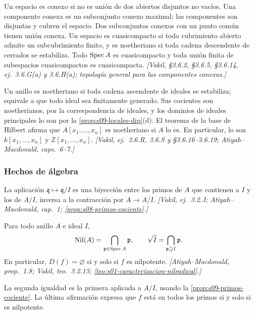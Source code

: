 \begin{defi}
\label{defi:s09-topologia-finita}
Un espacio es conexo si no es unión de dos abiertos disjuntos no vacíos. Una componente conexa es un subconjunto conexo maximal; las componentes son disjuntas y cubren el espacio. Dos subconjuntos conexos con un punto común tienen unión conexa. Un espacio es cuasicompacto si todo cubrimiento abierto admite un subcubrimiento finito, y es noetheriano si toda cadena descendente de cerrados se estabiliza. Todo $\operatorname{Spec} A$ es cuasicompacto y toda unión finita de subespacios cuasicompactos es cuasicompacta. \emph{[Vakil, \S3.6.2, \S3.6.5, \S3.6.14, ej.~3.6.G(a) y 3.6.H(a); topología general para las componentes conexas.]}
\end{defi}

\begin{defi}
\label{defi:s09-anillos-noetherianos}
Un anillo es noetheriano si toda cadena ascendente de ideales se estabiliza; equivale a que todo ideal sea finitamente generado. Sus cocientes son noetherianos, por la correspondencia de ideales, y los dominios de ideales principales lo son por la \cref{prop:s09-locales-dip}(d). El teorema de la base de Hilbert afirma que $A[x_1,\ldots,x_n]$ es noetheriano si $A$ lo es. En particular, lo son $k[x_1,\ldots,x_n]$ y $\mathbb Z[x_1,\ldots,x_n]$. \emph{[Vakil, ej.~3.6.R, 3.6.S y \S3.6.16--3.6.19; Atiyah--Macdonald, caps.~6--7.]}
\end{defi}

\subsubsection{Hechos de álgebra}

\begin{prop}
\label{prop:s09-primos-cociente}
La aplicación $\mathfrak q\mapsto\mathfrak q/I$ es una biyección entre los primos de $A$ que contienen a $I$ y los de $A/I$, inversa a la contracción por $A\to A/I$. \emph{[Vakil, ej.~3.2.J; Atiyah--Macdonald, cap.~1; \cref{prop:s08-primos-cociente}.]}
\end{prop}

\begin{prop}
\label{prop:s09-nilradical}
Para todo anillo $A$ e ideal $I$,
\[
\operatorname{Nil}(A)=\bigcap_{\mathfrak p\in\operatorname{Spec} A}\mathfrak p,
\qquad \sqrt I=\bigcap_{\mathfrak p\supseteq I}\mathfrak p.
\]
En particular, $D(f)=\varnothing$ si y solo si $f$ es nilpotente. \emph{[Atiyah--Macdonald, prop.~1.8; Vakil, teo.~3.2.13; \cref{teo:s01-caracterizacion-nilradical}.]}
\end{prop}
La segunda igualdad es la primera aplicada a $A/I$, usando la \cref{prop:s09-primos-cociente}. La última afirmación expresa que $f$ está en todos los primos si y solo si es nilpotente.

